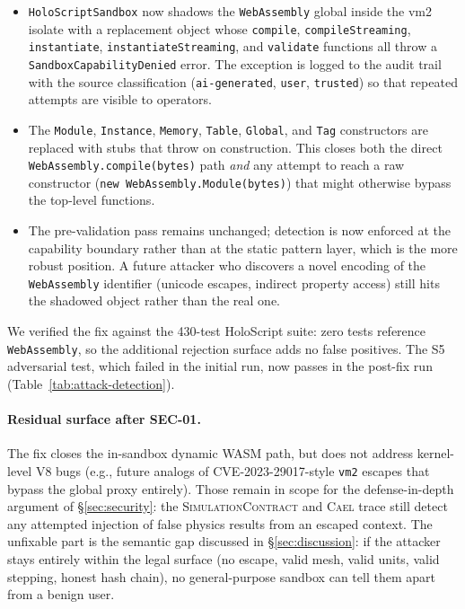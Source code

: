 \documentclass[letterpaper,twocolumn,10pt]{article}
\newcommand{\cael}{\textsc{Cael}}
\newcommand{\holoscript}{HoloScript}
\newcommand{\simcontract}{\textsc{SimulationContract}}
\begin{document}
\begin{itemize}[leftmargin=*,topsep=2pt,itemsep=1pt]
  \item \texttt{HoloScriptSandbox} now shadows the \texttt{WebAssembly}
    global inside the vm2 isolate with a replacement object whose
    \texttt{compile}, \texttt{compileStreaming}, \texttt{instantiate},
    \texttt{instantiateStreaming}, and \texttt{validate} functions
    all throw a \texttt{SandboxCapabilityDenied} error. The exception
    is logged to the audit trail with the source classification
    (\texttt{ai-generated}, \texttt{user}, \texttt{trusted}) so that
    repeated attempts are visible to operators.
  \item The \texttt{Module}, \texttt{Instance}, \texttt{Memory},
    \texttt{Table}, \texttt{Global}, and \texttt{Tag} constructors
    are replaced with stubs that throw on construction. This closes
    both the direct \texttt{WebAssembly.compile(bytes)} path
    \emph{and} any attempt to reach a raw constructor
    (\texttt{new WebAssembly.Module(bytes)}) that might otherwise
    bypass the top-level functions.
  \item The pre-validation pass remains unchanged; detection is now
    enforced at the capability boundary rather than at the static
    pattern layer, which is the more robust position. A future
    attacker who discovers a novel encoding of the
    \texttt{WebAssembly} identifier (unicode escapes, indirect
    property access) still hits the shadowed object rather than the
    real one.
\end{itemize}

We verified the fix against the 430-test \holoscript{} suite: zero
tests reference \texttt{WebAssembly}, so the additional rejection
surface adds no false positives. The S5 adversarial test, which
failed in the initial run, now passes in the post-fix run
(Table~\ref{tab:attack-detection}).

\paragraph{Residual surface after SEC-01.} The fix closes the
in-sandbox dynamic WASM path, but does not address kernel-level
V8 bugs (e.g., future analogs of CVE-2023-29017-style \texttt{vm2}
escapes that bypass the global proxy entirely). Those remain in scope
for the defense-in-depth argument of \S\ref{sec:security}: the
\simcontract{} and \cael{} trace still detect any attempted injection
of false physics results from an escaped context. The unfixable part
is the semantic gap discussed in \S\ref{sec:discussion}: if the
attacker stays entirely within the legal surface (no escape, valid
mesh, valid units, valid stepping, honest hash chain), no
general-purpose sandbox can tell them apart from a benign user.
\end{document}
